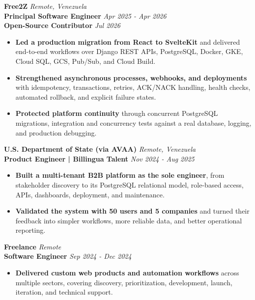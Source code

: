 \documentclass[10pt]{article}
\begin{document}
\vspace{2pt}
\textbf{Free2Z} \hfill \textit{Remote, Venezuela} \\
\textbf{Principal Software Engineer} \hfill \textit{Apr 2025 - Apr 2026} \\
\textbf{Open-Source Contributor} \hfill \textit{Jul 2026}
\begin{itemize}
    \item \textbf{Led a production migration from React to SvelteKit} and delivered end-to-end workflows over Django REST APIs, PostgreSQL, Docker, GKE, Cloud SQL, GCS, Pub/Sub, and Cloud Build.
    \item \textbf{Strengthened asynchronous processes, webhooks, and deployments} with idempotency, transactions, retries, ACK/NACK handling, health checks, automated rollback, and explicit failure states.
    \item \textbf{Protected platform continuity} through concurrent PostgreSQL migrations, integration and concurrency tests against a real database, logging, and production debugging.
\end{itemize}

\vspace{2pt}
\textbf{U.S. Department of State (via AVAA)} \hfill \textit{Remote, Venezuela} \\
\textbf{Product Engineer | Billingua Talent} \hfill \textit{Nov 2024 - Aug 2025}
\begin{itemize}
    \item \textbf{Built a multi-tenant B2B platform as the sole engineer}, from stakeholder discovery to its PostgreSQL relational model, role-based access, APIs, dashboards, deployment, and maintenance.
    \item \textbf{Validated the system with 50 users and 5 companies} and turned their feedback into simpler workflows, more reliable data, and better operational reporting.
\end{itemize}

\vspace{2pt}
\textbf{Freelance} \hfill \textit{Remote} \\
\textbf{Software Engineer} \hfill \textit{Sep 2024 - Dec 2024}
\begin{itemize}
    \item \textbf{Delivered custom web products and automation workflows} across multiple sectors, covering discovery, prioritization, development, launch, iteration, and technical support.
\end{itemize}
\end{document}
